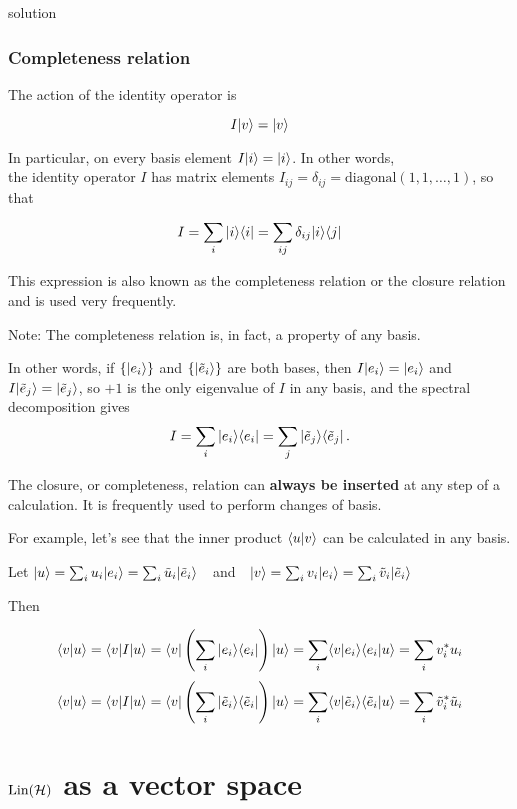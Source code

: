 \documentclass[11pt]{article}
\begin{document}
solution

    \subsubsection{Completeness relation}\label{completeness-relation}

The action of the identity operator is

\[
I |v\rangle = |v\rangle
\]

In particular, on every basis element \(I |i\rangle = |i\rangle\). In other
words,\\
the identity operator \(I\) has matrix elements
\(I_{ij} = \delta_{ij} = \text{diagonal}(1,1,\ldots,1)\), so that

\[
I = \sum_i | i\rangle \langle i| = \sum_{ij} \delta_{ij} | i\rangle \langle j|
\]

This expression is also known as the completeness relation or the
closure relation and is used very frequently.

    Note: The completeness relation is, in fact, a property of any basis.

In other words, if \(\{|e_i\rangle\}\) and \(\{|\tilde e_i\rangle\}\) are
both bases, then \(I |e_i\rangle = |e_i\rangle\) and
\(I |\tilde e_j\rangle = |\tilde e_j\rangle\), so \(+1\) is the only
eigenvalue of \(I\) in any basis, and the spectral decomposition gives
\[
I = \sum_i | e_i\rangle \langle e_i| = \sum_j | \tilde e_j\rangle \langle \tilde e_j| \, .
\]

    The closure, or completeness, relation can \textbf{always be inserted}
at any step of a calculation. It is frequently used to perform changes
of basis.

    For example, let's see that the inner product \(\langle u|v\rangle\) can be
calculated in any basis.

Let
\(|u\rangle = \sum_i u_i |e_i\rangle = \sum_i \tilde u_i |\tilde e_i\rangle~~\)
and \(~~
|v\rangle = \sum_i v_i |e_i\rangle = \sum_i \tilde v_i |\tilde e_i\rangle\)

    Then

\[ 
\langle v|u\rangle = \langle v| I |u\rangle = \langle v|\left(\sum_i| e_i\rangle \langle e_i|\right)|u\rangle = 
\sum_i \langle v|e_i\rangle\langle e_i|u\rangle = \sum_i v_i^* u_i
\] \[ 
\langle v|u\rangle = \langle v| I |u\rangle = \langle v|\left(\sum_i| \tilde e_i\rangle \langle \tilde e_i|\right)|u\rangle = 
\sum_i \langle v|\tilde e_i\rangle\langle \tilde e_i|u\rangle = \sum_i \tilde v_i^* \tilde u_i
\]

    \section{\texorpdfstring{\(\hbox{Lin}({\cal H})\) as a vector
space}{\textbackslash Lin(\textbackslash Hil) as a vector space}}\label{linhil-as-a-vector-space}
\end{document}
